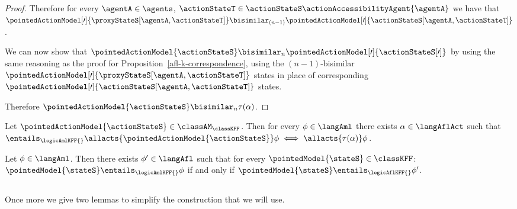 \documentclass[twoside]{aiml14}
\begin{document}
\begin{proof}
      Therefore for every $\agentA \in \agents$, 
      $\actionStateT \in \actionStateS \actionAccessibilityAgent{\agentA}$ we have that
      $\pointedActionModel[\prime]{\proxyStateS[\agentA,\actionStateT]} \bisimilar_{(n - 1)} \pointedActionModel[\prime]{\actionStateS[\agentA,\actionStateT]}$.

      We can now show that $\pointedActionModel{\actionStateS} \bisimilar_n \pointedActionModel[\prime]{\actionStateS[\prime]}$ 
      by using the same reasoning as the proof for Proposition~\ref{afl-k-correspondence}, using the $(n - 1)$-bisimilar
      $\pointedActionModel[\prime]{\proxyStateS[\agentA,\actionStateT]}$ states 
      in place of corresponding $\pointedActionModel[\prime]{\actionStateS[\agentA,\actionStateT]}$ states.

      Therefore $\pointedActionModel{\actionStateS} \bisimilar_n \tau(\alpha)$.
  \end{proof}

  \begin{corollary}
      Let $\pointedActionModel{\actionStateS} \in \classAM_\classKFF$.
      Then for every $\phi \in \langAml$
      there exists $\alpha \in \langAflAct$ 
      such that $\entails_\logicAmlKFF{} \allacts{\pointedActionModel{\actionStateS}} \phi \iff \allacts{\tau(\alpha)} \phi$.
  \end{corollary}

  \begin{corollary}
      Let $\phi \in \langAml$. 
      Then there exists $\phi' \in \langAfl$ 
      such that for every $\pointedModel{\stateS} \in \classKFF$: 
      $\pointedModel{\stateS} \entails_\logicAmlKFF{} \phi$ if and only if
      $\pointedModel{\stateS} \entails_\logicAflKFF{} \phi'$.
  \end{corollary}

  \subsection{\classS{}}

  Once more we give two lemmas to simplify the construction that we will use.
\end{document}
